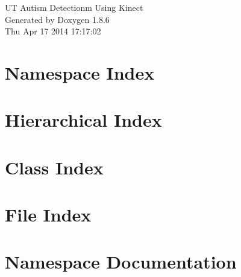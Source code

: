 \documentclass[twoside]{book}
\newcommand{\clearemptydoublepage}{%
  \newpage{\pagestyle{empty}\cleardoublepage}%
}
\begin{document}
\hypersetup{pageanchor=false}
\begin{titlepage}
\vspace*{7cm}
\begin{center}%
{\Large U\-T Autism Detectionm Using Kinect }\\
\vspace*{1cm}
{\large Generated by Doxygen 1.8.6}\\
\vspace*{0.5cm}
{\small Thu Apr 17 2014 17:17:02}\\
\end{center}
\end{titlepage}
\clearemptydoublepage
\tableofcontents
\clearemptydoublepage
{}
\hypersetup{pageanchor=true}

\chapter{Namespace Index}

\chapter{Hierarchical Index}

\chapter{Class Index}

\chapter{File Index}

\chapter{Namespace Documentation}



\end{document}
